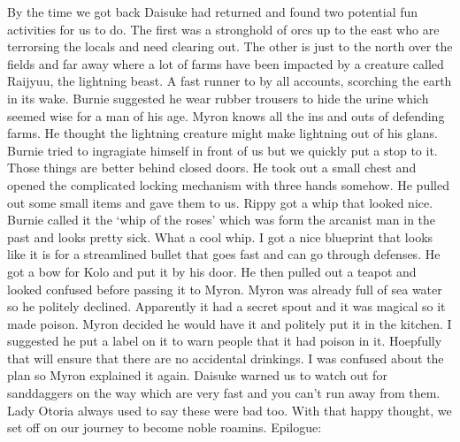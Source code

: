 By the time we got back Daisuke had returned and found two potential fun activities for us to do. The first was a stronghold of orcs up to the east who are terrorsing the locals and need clearing out. The other is just to the north over the fields and far away where a lot of farms have been impacted by a creature called Raijyuu, the lightning beast. A fast runner to by all accounts, scorching the earth in its wake. Burnie suggested he wear rubber trousers to hide the urine which seemed wise for a man of his age. Myron knows all the ins and outs of defending farms. He thought the lightning creature might make lightning out of his glans. Burnie tried to ingragiate himself in front of us but we quickly put a stop to it. Those things are better behind closed doors. He took out a small chest and opened the complicated locking mechanism with three hands somehow. He pulled out some small items and gave them to us. Rippy got a whip that looked nice. Burnie called it the ‘whip of the roses’ which was form the arcanist man in the past and looks pretty sick. What a cool whip. I got a nice blueprint that looks like it is for a streamlined bullet that goes fast and can go through defenses. He got a bow for Kolo and put it by his door. He then pulled out a teapot and looked confused before passing it to Myron. Myron was already full of sea water so he politely declined. Apparently it had a secret spout and it was magical so it made poison. Myron decided he would have it and politely put it in the kitchen. I suggested he put a label on it to warn people that it had poison in it. Hoepfully that will ensure that there are no accidental drinkings. I was confused about the plan so Myron explained it again. Daisuke warned us to watch out for sanddaggers on the way which are very fast and you can’t run away from them. Lady Otoria always used to say these were bad too. With that happy thought, we set off on our journey to become noble roamins.\medskip
Epilogue:\medskip
